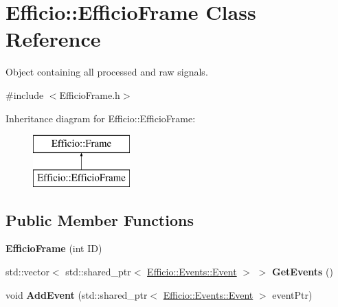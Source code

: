 \hypertarget{class_efficio_1_1_efficio_frame}{}\section{Efficio\+:\+:Efficio\+Frame Class Reference}
\label{class_efficio_1_1_efficio_frame}


Object containing all processed and raw signals.  




{\ttfamily \#include $<$Efficio\+Frame.\+h$>$}

Inheritance diagram for Efficio\+:\+:Efficio\+Frame\+:\begin{figure}[H]
\begin{center}
\leavevmode
\includegraphics[height=2.000000cm]{class_efficio_1_1_efficio_frame}
\end{center}
\end{figure}
\subsection*{Public Member Functions}
\begin{DoxyCompactItemize}
\item 
{\bfseries Efficio\+Frame} (int ID)\hypertarget{class_efficio_1_1_efficio_frame_a9b49dc8882fa2c58ebcd8710bb14de91}{}\label{class_efficio_1_1_efficio_frame_a9b49dc8882fa2c58ebcd8710bb14de91}

\item 
std\+::vector$<$ std\+::shared\+\_\+ptr$<$ \hyperlink{class_efficio_1_1_events_1_1_event}{Efficio\+::\+Events\+::\+Event} $>$ $>$ {\bfseries Get\+Events} ()\hypertarget{class_efficio_1_1_efficio_frame_a219e88c37091c04515e7022c65300654}{}\label{class_efficio_1_1_efficio_frame_a219e88c37091c04515e7022c65300654}

\item 
void {\bfseries Add\+Event} (std\+::shared\+\_\+ptr$<$ \hyperlink{class_efficio_1_1_events_1_1_event}{Efficio\+::\+Events\+::\+Event} $>$ event\+Ptr)\hypertarget{class_efficio_1_1_efficio_frame_a2a50c673ea34e5d85707a55099ebae63}{}\label{class_efficio_1_1_efficio_frame_a2a50c673ea34e5d85707a55099ebae63}

\end{DoxyCompactItemize}
